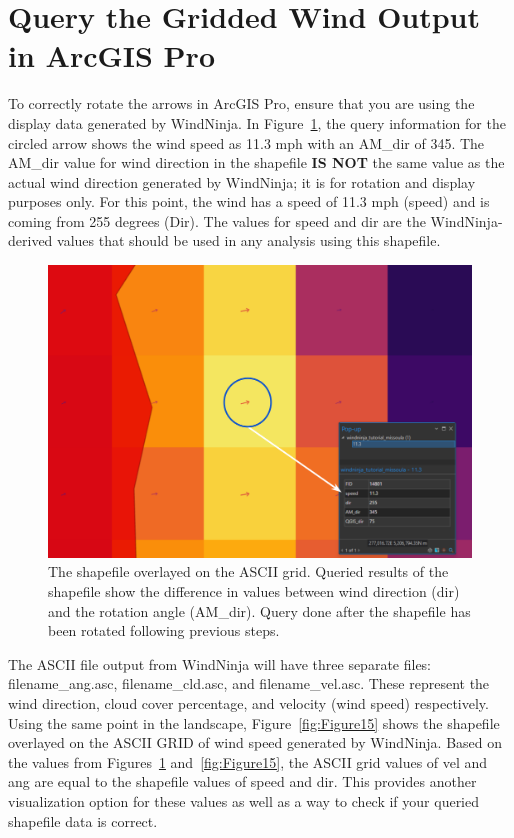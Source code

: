 \documentclass[12pt]{article}
\begin{document}
\section*{Query the Gridded Wind Output in ArcGIS Pro}
To correctly rotate the arrows in ArcGIS Pro, ensure that you are using the display data generated by WindNinja. In Figure~\ref{fig:Figure14}, the query information for the circled arrow shows the wind speed as 11.3 mph with an AM\_dir of 345. The AM\_dir value for wind direction in the shapefile \textbf{IS NOT} the same value as the actual wind direction generated by WindNinja; it is for rotation and display purposes only. For this point, the wind has a speed of 11.3 mph (speed) and is coming from 255 degrees (Dir). The values for speed and dir are the WindNinja-derived values that should be used in any analysis using this shapefile. 

\begin{figure}[H]
	\centering
	\includegraphics[scale=0.4]{arc_14.png}
	\caption{The shapefile overlayed on the ASCII grid. Queried results of the shapefile show the difference in values between wind direction (dir) and the rotation angle (AM\_dir). Query done after the shapefile has been rotated following previous steps.}
\label{fig:Figure14}
\end{figure}

\newpage

The ASCII file output from WindNinja will have three separate files: filename\_ang.asc, filename\_cld.asc, and filename\_vel.asc. These represent the wind direction, cloud cover percentage, and velocity (wind speed) respectively. Using the same point in the landscape, Figure~\ref{fig:Figure15} shows the shapefile overlayed on the ASCII GRID of wind speed generated by WindNinja. Based on the values from Figures~\ref{fig:Figure14} and~\ref{fig:Figure15}, the ASCII grid values of vel and ang are equal to the shapefile values of speed and dir. This provides another visualization option for these values as well as a way to check if your queried shapefile data is correct. 
\end{document}
